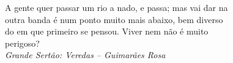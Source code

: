 %
%
%
%

A gente quer passar um rio a nado, e passa; mas vai dar na \\
outra banda é num ponto muito mais abaixo, bem diverso \\
do em que primeiro se pensou. Viver nem não é muito \\
perigoso? \\
\textit{Grande Sertão: Veredas -- Guimarães Rosa}